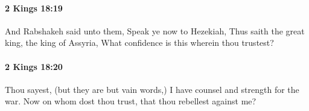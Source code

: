 		\paragraph{2 Kings 18:19} %
			\label{2KINGS-18-19}

			And Rabshakeh said unto them, Speak ye now to Hezekiah, Thus saith the great king, the king of Assyria, What confidence is this wherein thou trustest?


		\paragraph{2 Kings 18:20} %
			\label{2KINGS-18-20}

			Thou sayest, (but they are but vain words,) I have counsel and strength for the war. Now on whom dost thou trust, that thou rebellest against me?



